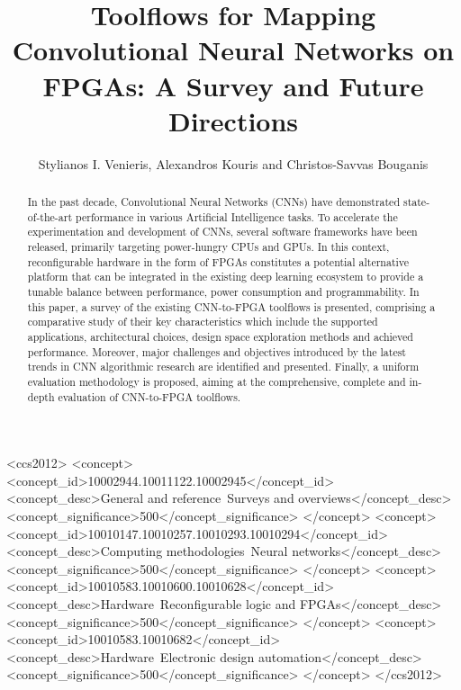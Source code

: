 \documentclass[format=acmsmall, review=false, screen=true]{acmart}
\begin{document}
\title[Toolflows for Mapping CNNs on FPGAs: A Survey and Future Directions]{Toolflows for Mapping Convolutional Neural Networks on FPGAs: A Survey and Future Directions}  

\author{Stylianos I. Venieris, Alexandros Kouris and Christos-Savvas Bouganis}

\begin{abstract}
In the past decade, Convolutional Neural Networks (CNNs) have demonstrated state-of-the-art performance in various Artificial Intelligence tasks. To accelerate the experimentation and development of CNNs, several software frameworks have been released, primarily targeting power-hungry CPUs and GPUs. In this context, reconfigurable hardware in the form of FPGAs constitutes a potential alternative platform that can be integrated in the existing {\color{black}deep learning} ecosystem to provide a tunable balance between performance, power consumption and programmability. In this paper, a survey of the existing CNN-to-FPGA toolflows is presented, comprising a comparative study of their key characteristics which include the supported applications, architectural choices, design space exploration methods and achieved performance. Moreover, major challenges and objectives introduced by the latest trends in CNN algorithmic research are identified and presented. Finally, a uniform evaluation methodology is proposed, aiming at the comprehensive, complete and in-depth evaluation of CNN-to-FPGA toolflows.
\end{abstract}


\begin{CCSXML}
<ccs2012>
<concept>
<concept_id>10002944.10011122.10002945</concept_id>
<concept_desc>General and reference~Surveys and overviews</concept_desc>
<concept_significance>500</concept_significance>
</concept>
<concept>
<concept_id>10010147.10010257.10010293.10010294</concept_id>
<concept_desc>Computing methodologies~Neural networks</concept_desc>
<concept_significance>500</concept_significance>
</concept>
<concept>
<concept_id>10010583.10010600.10010628</concept_id>
<concept_desc>Hardware~Reconfigurable logic and FPGAs</concept_desc>
<concept_significance>500</concept_significance>
</concept>
<concept>
<concept_id>10010583.10010682</concept_id>
<concept_desc>Hardware~Electronic design automation</concept_desc>
<concept_significance>500</concept_significance>
</concept>
</ccs2012>
\end{CCSXML}
\end{document}
